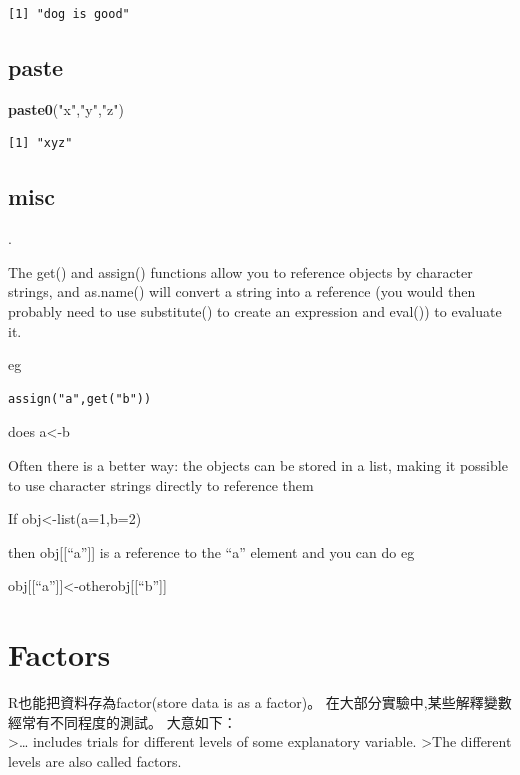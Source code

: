\documentclass[]{book}
\newenvironment{Shaded}{\begin{snugshade}}{\end{snugshade}}
\newcommand{\KeywordTok}[1]{\textcolor[rgb]{0.13,0.29,0.53}{\textbf{#1}}}
\newcommand{\NormalTok}[1]{#1}
\newcommand{\StringTok}[1]{\textcolor[rgb]{0.31,0.60,0.02}{#1}}
\theoremstyle{definition}
\theoremstyle{definition}
\theoremstyle{definition}
\theoremstyle{remark}
\begin{document}
\begin{verbatim}
[1] "dog is good"
\end{verbatim}

\hypertarget{paste}{%
\subsection{paste}\label{paste}}

\begin{Shaded}
\begin{Highlighting}[]
\KeywordTok{paste0}\NormalTok{(}\StringTok{"x"}\NormalTok{,}\StringTok{"y"}\NormalTok{,}\StringTok{"z"}\NormalTok{)}
\end{Highlighting}
\end{Shaded}

\begin{verbatim}
[1] "xyz"
\end{verbatim}

\hypertarget{misc}{%
\subsection{misc}\label{misc}}

.

The get() and assign() functions allow you to reference objects by
character strings, and as.name() will convert a string into a reference
(you would then probably need to use substitute() to create an
expression and eval()) to evaluate it.

eg

\begin{verbatim}
assign("a",get("b"))
\end{verbatim}

does a\textless{}-b

Often there is a better way: the objects can be stored in a list, making
it possible to use character strings directly to reference them

If obj\textless{}-list(a=1,b=2)

then obj{[}{[}``a''{]}{]} is a reference to the ``a'' element and you
can do eg

obj{[}{[}``a''{]}{]}\textless{}-otherobj{[}{[}``b''{]}{]}

\hypertarget{factors}{%
\section{Factors}\label{factors}}

R也能把資料存為factor(store data is as a factor)。
在大部分實驗中,某些解釋變數經常有不同程度的測試。 大意如下：\\
\textgreater{}\ldots{} includes trials for different levels of some
explanatory variable. \textgreater{}The different levels are also called
factors.
\end{document}
